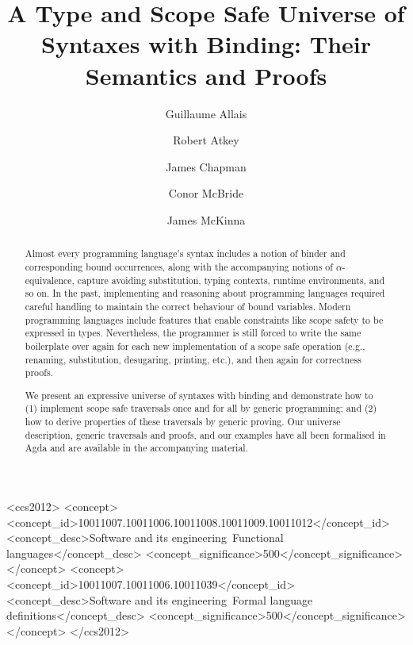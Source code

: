 \documentclass[format=acmsmall, screen=true]{acmart}
\begin{document}
\title[A Type and Scope Safe Universe of Syntaxes with Binding]{A Type and Scope Safe Universe of Syntaxes with Binding: Their Semantics and Proofs}
\author{Guillaume Allais}
\author{Robert Atkey}
\author{James Chapman}
\author{Conor McBride}
\author{James McKinna}

\begin{abstract}
Almost every programming language's syntax includes a notion of binder
and corresponding bound occurrences, along with the accompanying
notions of $\alpha$-equivalence, capture avoiding substitution, typing
contexts, runtime environments, and so on. In the past, implementing
and reasoning about programming languages required careful handling to
maintain the correct behaviour of bound variables. Modern programming
languages include features that enable constraints like scope safety
to be expressed in types. Nevertheless, the programmer is still forced
to write the same boilerplate over again for each new implementation
of a scope safe operation (e.g., renaming, substitution, desugaring,
printing, etc.), and then again for correctness proofs.

We present an expressive universe of syntaxes with binding and
demonstrate how to (1) implement scope safe traversals once and for
all by generic programming; and (2) how to derive properties of these
traversals by generic proving. Our universe description, generic
traversals and proofs, and our examples have all been formalised in
Agda and are available in the accompanying material.
\end{abstract}


%
%
\begin{CCSXML}
<ccs2012>
<concept>
<concept_id>10011007.10011006.10011008.10011009.10011012</concept_id>
<concept_desc>Software and its engineering~Functional languages</concept_desc>
<concept_significance>500</concept_significance>
</concept>
<concept>
<concept_id>10011007.10011006.10011039</concept_id>
<concept_desc>Software and its engineering~Formal language definitions</concept_desc>
<concept_significance>500</concept_significance>
</concept>
</ccs2012>
\end{CCSXML}
\end{document}
